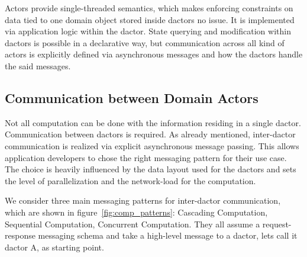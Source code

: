     Actors provide single-threaded semantics, which makes enforcing constraints on data tied to one domain object stored inside \glspl{dactor} no issue.
    It is implemented via application logic within the \gls{dactor}.
    State querying and modification within \glspl{dactor} is possible in a declarative way, but communication across all kind of actors is explicitly defined via asynchronous messages and how the \glspl{dactor} handle the said messages.

  \subsection{Communication between Domain Actors}
    Not all computation can be done with the information residing in a single \gls{dactor}.
    Communication between \glspl{dactor} is required.
    As already mentioned, inter-\gls{dactor} communication is realized via explicit asynchronous message passing.
    This allows application developers to chose the right messaging pattern for their use case.
    The choice is heavily influenced by the data layout used for the \glspl{dactor} and sets the level of parallelization and the network-load for the computation.

    We consider three main messaging patterns for inter-\gls{dactor} communication, which are shown in figure~\ref{fig:comp_patterns}: Cascading Computation, Sequential Computation, Concurrent Computation.
    They all assume a request-response messaging schema and take a high-level message to a \gls{dactor}, lets call it \gls{dactor} A, as starting point.

